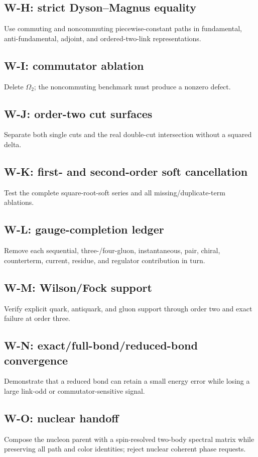 \documentclass[11pt]{article}
\begin{document}
\subsection{W-H: strict Dyson--Magnus equality}
Use commuting and noncommuting piecewise-constant paths in fundamental,
anti-fundamental, adjoint, and ordered-two-link representations.

\subsection{W-I: commutator ablation}
Delete \(\Omega_2\); the noncommuting benchmark must produce a nonzero defect.

\subsection{W-J: order-two cut surfaces}
Separate both single cuts and the real double-cut intersection without a
squared delta.

\subsection{W-K: first- and second-order soft cancellation}
Test the complete square-root-soft series and all missing/duplicate-term
ablations.

\subsection{W-L: gauge-completion ledger}
Remove each sequential, three-/four-gluon, instantaneous, pair, chiral,
counterterm, current, residue, and regulator contribution in turn.

\subsection{W-M: Wilson/Fock support}
Verify explicit quark, antiquark, and gluon support through order two and exact
failure at order three.

\subsection{W-N: exact/full-bond/reduced-bond convergence}
Demonstrate that a reduced bond can retain a small energy error while losing a
large link-odd or commutator-sensitive signal.

\subsection{W-O: nuclear handoff}
Compose the nucleon parent with a spin-resolved two-body spectral matrix while
preserving all path and color identities; reject nuclear coherent phase
requests.
\end{document}
